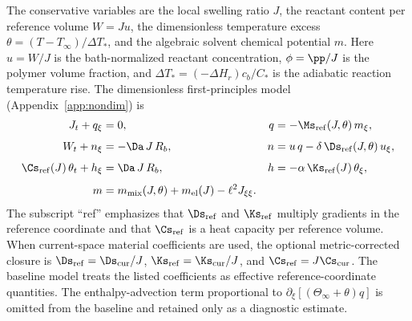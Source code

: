The conservative variables are the local swelling ratio $J$, the
reactant content per reference volume $W=Ju$, the dimensionless
temperature excess $\theta=(T-T_\infty)/\Delta T_*$, and the
algebraic solvent chemical potential $m$.  Here
$u=W/J$ is the bath-normalized reactant concentration,
$\phi=\pp/J$ is the polymer volume fraction, and
$\Delta T_*=(-\Delta H_r)c_b/C_*$ is the adiabatic reaction
temperature rise.  The dimensionless first-principles model
(Appendix~\ref{app:nondim}) is
\begin{subequations}
\label{eq:governing}
\begin{align}
  J_t + q_\xi &= 0,
  & q &= -\Ms_\mathrm{ref}(J,\theta)\,m_\xi, \label{eq:gov_J}\\[4pt]
  W_t + n_\xi &= -\Da\,J\,R_b,
  & n &= u\,q-\delta\,\Ds_\mathrm{ref}(J,\theta)\,u_\xi,
  \label{eq:gov_u}\\[4pt]
  \Cs_\mathrm{ref}(J)\,\theta_t + h_\xi &= \Da\,J\,R_b,
  & h &= -\alpha\,\Ks_\mathrm{ref}(J)\,\theta_\xi,
  \label{eq:gov_theta}\\[4pt]
  m &= m_\mathrm{mix}(J,\theta)+m_\mathrm{el}(J)-\ell^2J_{\xi\xi}.
  \label{eq:gov_m}
\end{align}
\end{subequations}
The subscript ``ref'' emphasizes that $\Ds_\mathrm{ref}$ and
$\Ks_\mathrm{ref}$ multiply gradients in the reference coordinate
and that $\Cs_\mathrm{ref}$ is a heat capacity per reference volume.
When current-space material coefficients are used, the optional
metric-corrected closure is
$\Ds_\mathrm{ref}=\Ds_\mathrm{cur}/J$,
$\Ks_\mathrm{ref}=\Ks_\mathrm{cur}/J$, and
$\Cs_\mathrm{ref}=J\Cs_\mathrm{cur}$.  The baseline model treats the
listed coefficients as effective reference-coordinate quantities.
The enthalpy-advection term proportional to
$\partial_\xi[(\Theta_\infty+\theta)q]$ is omitted from the baseline
and retained only as a diagnostic estimate.

